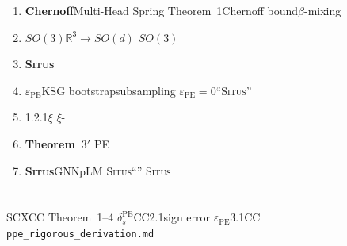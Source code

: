 \documentclass[11pt,a4paper]{article}
\theoremstyle{remark}
\DeclareMathOperator{\PE}{PE}
\newcommand{\R}{\mathbb{R}}
\newcommand{\Situs}{\textsc{Situs}}
\begin{document}
\begin{enumerate}[label=(\arabic*), leftmargin=*]

    \item \textbf{Chernoff}Multi-Head Spring
          Theorem~1Chernoff bound$\beta$-mixing
          \cite{scx2026cc_audit}

    \item \textbf{$SO(3)$}$\R^3 \to SO(d)$
          $SO(3)$
          

    \item \textbf{\Situs{}}
          

    \item \textbf{$\varepsilon_{\PE}$}KSG
          bootstrapsubsampling
          $\varepsilon_{\PE} = 0$``\Situs{}''

    \item \textbf{}1.2.1$\xi$
          $\xi$-
          

    \item \textbf{Theorem~$3'$}
          PE
          

    \item \textbf{\Situs{}}GNNpLM
          \Situs{}``''
          \Situs{}\emph{}

\end{enumerate}

\section*{}

SCXCC\cite{scx2026cc_audit}
Theorem~1--4
$\delta_s^{\PE}$CC2.1sign error
$\varepsilon_{\PE}$3.1CC
\texttt{ppe\_rigorous\_derivation.md}
\end{document}

